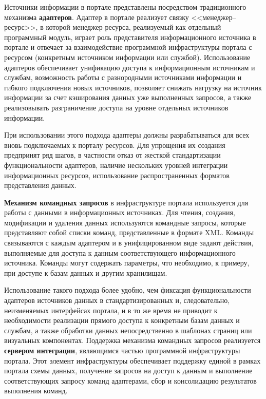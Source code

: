 \begin{multicols}{2}
{}

 Источники информации в портале представлены посредством традиционного
механизма \textbf{адап\-те\-ров}. Адаптер в портале реализует связку
 <<ме\-нед\-жер--ре\-сурс>>, в которой менеджер ресурса, реализуемый как отдельный
программный модуль, играет роль представителя информационного источника в портале
и отвечает за взаимодействие программной инфраструктуры портала с ресурсом
(конкретным источником информации или службой). Использование адаптеров
обеспечивает унификацию доступа к информационным источникам и службам,
возможность работы с разнородными источниками информации и гибкого подключения
новых источников, позволяет снижать нагрузку на источник информации за счет
кэширования данных уже выполненных запросов, а также реализовывать разграничение
доступа на уровне отдельных источников информации.

 При использовании этого подхода адаптеры должны разрабатываться для всех
вновь подключаемых к порталу ресурсов. Для упрощения их создания предпринят ряд
шагов, в частности отказ от жесткой стандартизации функциональности адап\-те\-ров,
наличие нескольких уровней интеграции информационных ресурсов, использование
распространенных форматов представления данных.

 \textbf{Механизм командных запросов} в инфраструктуре портала используется для
работы с данными в информационных источниках. Для чтения, создания, модификации и
удаления данных используются командные запросы, которые представляют собой списки
команд, представленные в формате XML. Команды связываются с каждым адаптером и в
унифицированном виде задают действия, выполняемые для доступа к данным
соответствующего информационного источника. Команды могут содержать параметры,
что необходимо, к примеру, при доступе к базам данных и другим хра\-ни\-лищам.
{

}

 Использование такого подхода более удобно, чем фиксация функциональности
адаптеров источников данных в стандартизированных и, следовательно, неизменяемых
интерфейсах портала, и в то же время не приводит к необходимости реа\-ли\-за\-ции прямого
доступа к конкретным базам данных и службам, а также обработки данных
не\-по\-сред\-ст\-вен\-но в шаблонах страниц или визуальных ком\-по\-нен\-тах. Поддержка
механизма командных \mbox{запросов} реализуется \textbf{сервером интеграции}, яв\-ля\-ющим\-ся
\mbox{частью} программной инфраструктуры портала. Этот элемент инфраструктуры
обеспечивает поддержку единой в рамках портала схемы данных, получение запросов на
доступ к данным и выполнение соответствующих запросу команд адап\-те\-ра\-ми, сбор и
консолидацию результатов выполнения %
 команд.
{%

}
\end{multicols}
